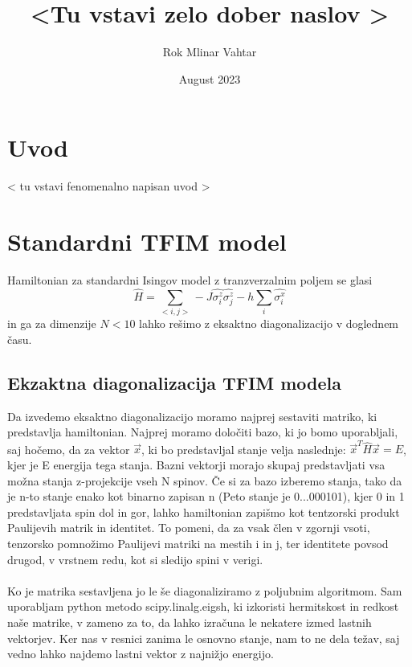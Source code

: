 \documentclass{article}
\title{\HUGE \textless Tu vstavi zelo dober naslov \textgreater}
\author{Rok Mlinar Vahtar}
\date{August 2023}
\begin{document}
\maketitle

\section{Uvod}
\textless \hspace{1pt} tu vstavi fenomenalno napisan uvod \textgreater


\section{Standardni TFIM model}
Hamiltonian za standardni Isingov model z tranzverzalnim poljem se glasi
\begin{equation}
    \hat{H} = \sum_{< i,j >} -J \hat{\sigma_i^z} \hat{\sigma_j^z} - h\sum_i \hat{\sigma_i^x}
\end{equation}
in ga za dimenzije $N < 10$ lahko rešimo z eksaktno diagonalizacijo v doglednem času. 

 \subsection{Ekzaktna diagonalizacija TFIM modela}
Da izvedemo eksaktno diagonalizacijo moramo najprej sestaviti matriko, ki predstavlja hamiltonian. Najprej moramo določiti bazo, ki jo bomo uporabljali, saj hočemo, da za vektor $\Vec{x}$, ki bo predstavljal stanje velja naslednje: $\Vec{x}^T \hat{H} \Vec{x} = E$, kjer je E energija tega stanja. Bazni vektorji morajo skupaj predstavljati vsa možna stanja z-projekcije vseh N spinov. Če si za bazo izberemo stanja, tako da je n-to stanje enako kot binarno zapisan n (Peto stanje je 0...000101), kjer 0 in 1 predstavljata spin dol in gor, lahko hamiltonian zapišmo kot tentzorski produkt Paulijevih matrik in identitet. To pomeni, da za vsak člen v zgornji vsoti, tenzorsko pomnožimo Paulijevi matriki na mestih i in j, ter identitete povsod drugod, v vrstnem redu, kot si sledijo spini v verigi.\\\\
Ko je matrika sestavljena jo le še diagonaliziramo z poljubnim algoritmom. Sam uporabljam python metodo scipy.linalg.eigsh, ki izkoristi hermitskost in redkost naše matrike, v zameno za to, da lahko izračuna le nekatere izmed lastnih vektorjev. Ker nas v resnici zanima le osnovno stanje, nam to ne dela težav, saj vedno lahko najdemo lastni vektor z najnižjo energijo.\\\\\\
\end{document}
